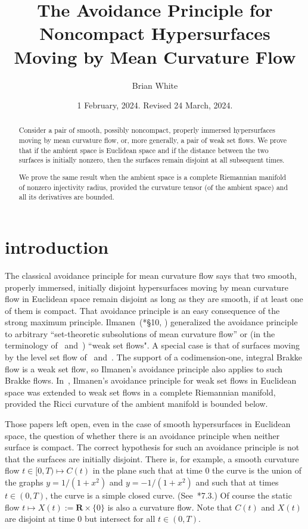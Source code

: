 \documentclass{amsart}
\title[The Avoidance Principle]{The Avoidance Principle for Noncompact Hypersurfaces Moving by Mean Curvature Flow}
\author{Brian White}
\date{1 February, 2024.  Revised 24 March, 2024.}
\newcommand{\RR}{\mathbf{R}}  %
\theoremstyle{definition}
\theoremstyle{definition}
\begin{document}
\maketitle
\begin{abstract}
Consider a pair of smooth, possibly noncompact, properly immersed hypersurfaces moving by mean curvature flow, 
or, more generally, a pair of weak set flows.  We prove that if the ambient space is Euclidean space
and if the distance between the two surfaces is initially nonzero, then the surfaces remain disjoint
at all subsequent times.

We prove the same result when the ambient space is a complete Riemannian manifold of
nonzero injectivity
radius, provided the curvature tensor (of the ambient space) and all its derivatives are bounded.
\end{abstract}

\section{introduction}
The classical avoidance principle for mean curvature flow says that
two smooth, properly immersed, initially disjoint hypersurfaces moving by mean curvature flow in Euclidean space
remain disjoint as long as they are smooth, if at least one of them is compact.  
That avoidance principle is an easy consequence
of the strong maximum principle.   Ilmanen~(\cite{ilmanen-elliptic}*{\S10}, \cite{ilmanen-proc})
 generalized the avoidance principle
to arbitrary ``set-theoretic subsolutions of mean curvature flow'' 
or (in the terminology of~\cite{white-topology} and~\cite{hershkovits-w-avoid})
``weak set flows".  A special case is that of surfaces moving by the 
level set flow of~\cite{chen-giga-goto} and~\cite{evans-spruck}.
The support of a codimension-one, integral Brakke flow is a weak set flow, so Ilmanen's avoidance principle
also applies to such Brakke flows.
In~\cite{hershkovits-w-avoid}, Ilmanen's avoidance principle for weak set flows in Euclidean space was extended to weak set flows
in a complete Riemannian manifold, provided  the Ricci curvature of the ambient manifold is bounded below.


Those papers left open, even in the case of smooth hypersurfaces in Euclidean space,
 the question of whether there is an avoidance principle when neither surface is compact.
The correct hypothesis for such an avoidance principle
 is not that the surfaces are initially disjoint.  There is, for example,
a smooth curvature flow $t\in [0,T)\mapsto C(t)$ in the plane such that at time $0$ the curve is the union of the graphs
$y= 1/(1+x^2)$ and $y= -1/(1+x^2)$ and such that at times $t\in (0,T)$, the curve is a simple closed curve. 
(See~\cite{ilmanen-indiana}*{7.3}.)
Of course the static flow $t\mapsto X(t):=\RR\times \{0\}$ is also a curvature flow.
Note that $C(t)$ and $X(t)$ are disjoint at time $0$ but intersect for all $t\in (0,T)$.
\end{document}
